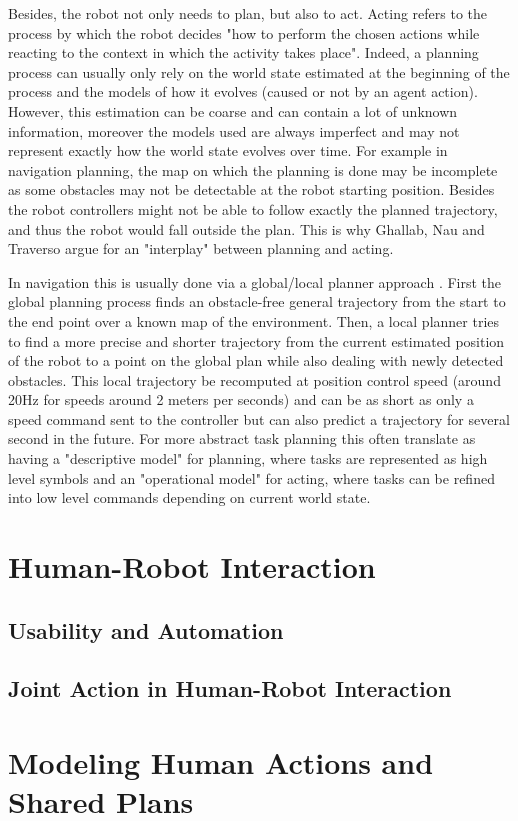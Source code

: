 \documentclass[a4paper,11pt,twoside]{StyleThese}
\begin{document}
Besides, the robot not only needs to plan, but also to act. Acting refers to the process by which the robot decides "how to perform the chosen actions while reacting to the context in which the activity takes place". Indeed, a planning process can usually only rely on the world state estimated at the beginning of the process and the models of how it evolves (caused or not by an agent action). However, this estimation can be coarse and can contain a lot of unknown information, moreover the models used are always imperfect and may not represent exactly how the world state evolves over time. For example in navigation planning, the map on which the planning is done may be incomplete as some obstacles may not be detectable at the robot starting position. Besides the robot controllers might not be able to follow exactly the planned trajectory, and thus the robot would fall outside the plan. This is why Ghallab, Nau and Traverso argue for an "interplay" between planning and acting.

In navigation this is usually done via a global/local planner approach \cite{choset2005principles} . First the global planning process finds an obstacle-free general trajectory from the start to the end point over a known map of the environment. Then, a local planner tries to find a more precise and shorter trajectory from the current estimated position of the robot to a point on the global plan while also dealing with newly detected obstacles. This local trajectory be recomputed at position control speed (around 20Hz for speeds around 2 meters per seconds) and can be as short as only a speed command sent to the controller  but can also predict a trajectory for several second in the future.  For more abstract task planning this often translate as having a "descriptive model" for planning, where tasks are represented as high level symbols and an "operational model" for acting, where tasks can be refined into low level commands depending on current world state. 


\section{Human-Robot Interaction}
\subsection{Usability and Automation}

\subsection{Joint Action in Human-Robot Interaction}

\section{Modeling Human Actions and Shared Plans}

\ifdefined{}
\else


\end{document}
